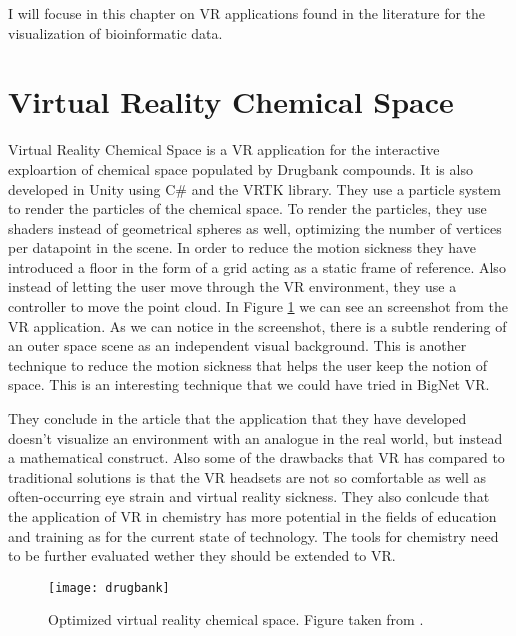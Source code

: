 I will focuse in this chapter on VR applications found in the literature for the visualization of bioinformatic data.

\section{Virtual Reality Chemical Space}
Virtual Reality Chemical Space is a VR application for the interactive exploartion of chemical space populated by Drugbank compounds\cite{drugbank}. It is also developed in Unity using C\# and the VRTK library. They use a particle system to render the particles of the chemical space. To render the particles, they use shaders instead of geometrical spheres as well, optimizing the number of vertices per datapoint in the scene. In order to reduce the motion sickness they have introduced a floor in the form of a grid acting as a static frame of reference. Also instead of letting the user move through the VR environment, they use a controller to move the point cloud. In Figure \ref{fig:drugbank} we can see an screenshot from the VR application. As we can notice in the screenshot, there is a subtle rendering of an outer space scene as an independent visual background. This is another technique to reduce the motion sickness that helps the user keep the notion of space. This is an interesting technique that we could have tried in BigNet VR.

They conclude in the article that the application that they have developed doesn't visualize an environment with an analogue in the real world, but instead a mathematical construct. Also some of the drawbacks that VR has compared to traditional solutions is that the VR headsets are not so comfortable as well as often-occurring eye strain and virtual reality sickness. They also conlcude that the application of VR in chemistry has more potential in the fields of education and training as for the current state of technology. The tools for chemistry need to be further evaluated wether they should be extended to VR.

\begin{figure}[h!]
    \centering%
    \texttt{[image: drugbank]}
    \caption{Optimized virtual reality chemical space. Figure taken from \cite{drugbank}.}
    \label{fig:drugbank}
\end{figure}%

